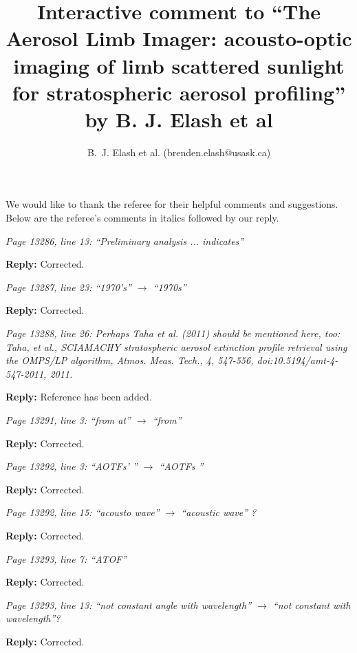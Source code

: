 \documentclass[12pt, notitlepage]{article}
\title{Interactive comment to ``The Aerosol Limb Imager: acousto-optic imaging of limb scattered
sunlight for stratospheric aerosol profiling'' by B. J. Elash et al}
\author{B.~J. Elash et al. (brenden.elash@usask.ca)}
\begin{document}
\begin{titlepage}
\maketitle
\end{titlepage}


We would like to thank the referee for their helpful comments and suggestions. Below are the referee's comments in italics followed by our reply.

\hrulefill

\textit{Page 13286, line 13: ``Preliminary analysis ... indicates''}

\textbf{Reply:} Corrected.

\hrulefill

\textit{Page 13287, line 23: ``1970's'' $\rightarrow$ ``1970s''}

\textbf{Reply:} Corrected.

\hrulefill

\textit{Page 13288, line 26: Perhaps Taha et al. (2011) should be mentioned here, too: Taha, et al., SCIAMACHY stratospheric aerosol extinction profile retrieval using the OMPS/LP algorithm, Atmos. Meas. Tech., 4, 547-556, doi:10.5194/amt-4-547-2011, 2011.}

\textbf{Reply:} Reference has been added.

\hrulefill

\textit{Page 13291, line 3: ``from at'' $\rightarrow$ ``from''}

\textbf{Reply:} Corrected.

\hrulefill

\textit{Page 13292, line 3: ``AOTFs' '' $\rightarrow$ ``AOTFs ''}

\textbf{Reply:} Corrected.

\hrulefill

\textit{Page 13292, line 15: ``acousto wave'' $\rightarrow$ ``acoustic wave'' ?}

\textbf{Reply:} Corrected.

\hrulefill

\textit{Page 13293, line 7: ``ATOF''}

\textbf{Reply:} Corrected.

\hrulefill

\textit{Page 13293, line 13: ``not constant angle with wavelength'' $\rightarrow$ ``not constant with wavelength''?}

\textbf{Reply:} Corrected.

\hrulefill
\end{document}
